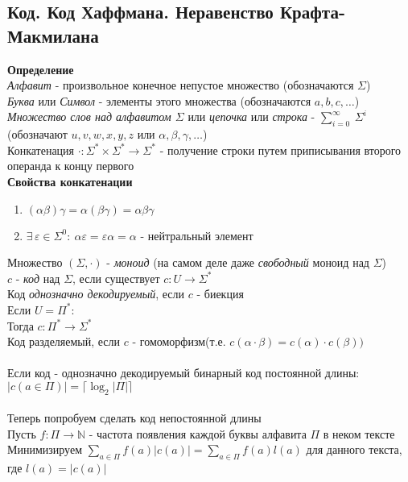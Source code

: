 \documentclass[12pt]{article}
\begin{document}
\subsection{Код. Код Хаффмана. Неравенство Крафта-Макмилана}
\textbf{Определение}\\
\textit{Алфавит} - произвольное конечное непустое множество (обозначаются $\Sigma$)\\
\textit{Буква} или \textit{Символ} - элементы этого множества (обозначаются $a,b,c,\ldots$)\\
\textit{Множество слов над алфавитом $\Sigma$} или \textit{цепочка} или \textit{строка} - $\sum_{i=0}^\infty\ \Sigma^i$ (обозначают $u,v,w,x,y,z$ или $\alpha, \beta, \gamma, \ldots$)\\
Конкатенация $\cdot: \Sigma^*\times\Sigma^* \rightarrow \Sigma^*$ - получение строки путем приписывания второго операнда к концу первого\\
\textbf{Свойства конкатенации}
\begin{enumerate}
    \item $(\alpha\beta)\gamma = \alpha(\beta\gamma) = \alpha\beta\gamma$
    \item $\exists\,\varepsilon \in \Sigma^0:\ \alpha\varepsilon = \varepsilon\alpha=\alpha$ - нейтральный элемент
\end{enumerate}
Множество $(\Sigma, \cdot)$ - \textit{моноид} (на самом деле даже \textit{свободный} моноид над $\Sigma$)\\
$c$ - \textit{код} над $\Sigma$, если существует $c: U\rightarrow \Sigma^*$\\
Код \textit{однозначно декодируемый}, если $c$ - биекция\\
Если $U = \Pi^*$:\\
Тогда $c:\Pi^*\rightarrow \Sigma^*$\\
Код разделяемый, если $c$ - гомоморфизм(т.е. $c(\alpha\cdot\beta) = c(\alpha)\cdot c(\beta))$\\\\
Если код - однозначно декодируемый бинарный код постоянной длины:\\
$|c(a\in \Pi)| = \lceil \log_2 |\Pi| \rceil$\\\\
Теперь попробуем сделать код непостоянной длины\\
Пусть $f:\Pi \rightarrow \mathbb{N}$ - частота появления каждой буквы алфавита $\Pi$ в неком тексте\\
Минимизируем $\sum_{a\in\Pi} f(a)|c(a)| = \sum_{a\in\Pi} f(a)l(a)$ для данного текста, где $l(a)=|c(a)|$\\
\end{document}

